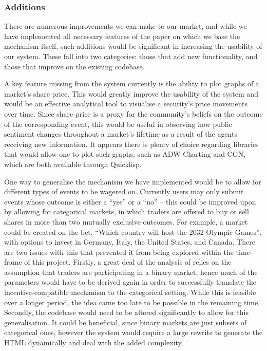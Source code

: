 \subsubsection{Additions}

There are numerous improvements we can make to our market, and while we have
implemented all necessary features of the paper on which we base the mechanism
itself, such additions would be significant in increasing the usability of our
system. These fall into two categories: those that add new functionality, and
those that improve on the existing codebase.

A key feature missing from the system currently is the ability to plot graphs
of a market's share price. This would greatly improve the usability of the
system and would be an effective analytical tool to visualise a security's
price movements over time. Since share price is a proxy for the community's
beliefs on the outcome of the corresponding event, this would be useful in
observing how public sentiment changes throughout a market's lifetime as a
result of the agents receiving new information. It appears there is plenty of
choice regarding libraries that would allow one to plot such graphs, such as
ADW-Charting and CGN, which are both available through Quicklisp.

One way to generalise the mechanism we have implemented would be to allow for
different types of events to be wagered on. Currently users may only submit
events whose outcome is either a ``yes'' or a ``no'' -- this could be improved
upon by allowing for categorical markets, in which traders are offered to
buy or sell shares in more than two mutually exclusive outcomes. For example, a
market could be created on the bet, ``Which country will host the 2032 Olympic Games'',
with options to invest in Germany, Italy, the United States, and Canada. There
are two issues with this that prevented it from being explored within the
time-frame of this project. Firstly, a great deal of the analysis of
\cite{Freeman2017} relies on the assumption that traders are participating in a
binary market, hence much of the parameters would have to be derived again in
order to successfully translate the incentive-compatible mechanism to the
categorical setting. While this is feasible over a longer period, the idea came
too late to be possible in the remaining time. Secondly, the codebase would
need to be altered significantly to allow for this generalisation. It could be
beneficial, since binary markets are just subsets of categorical ones, however
the system would require a large rewrite to generate the HTML dynamically and
deal with the added complexity.

